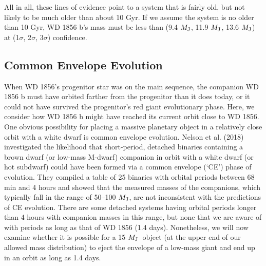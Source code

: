 \documentclass{nature3}
\newcommand*{\bedit}{\textcolor{new_black}}
\newcommand{\mjup}{\ensuremath{M_{\rm J}}}
\begin{document}
\begin{methods}
All in all, these lines of evidence point to a system that is fairly old, but not likely to be much older than about 10 Gyr. If we assume the system is no older than 10 Gyr, WD 1856 b's mass must be less than (9.4 \mjup, 11.9 \mjup, 13.6 \mjup) at (1$\sigma$, 2$\sigma$, 3$\sigma$) confidence.  


\subsection{Common Envelope Evolution}
When WD 1856's progenitor star was on the main sequence, the companion WD 1856 b must have orbited farther from the progenitor than it does today, or it could not have survived the progenitor's red giant evolutionary phase. Here, we consider how WD 1856 b might have reached its current orbit close to WD 1856. One obvious possibility for placing a massive planetary object in a relatively close orbit with a white dwarf is common envelope \bedit{evolution}\cite{Paczynski1976, Webbink84, Pfahl03}. Nelson et al. (2018)\cite{nelson2018} investigated the likelihood that short-period, detached binaries containing a brown dwarf (or low-mass M-dwarf) companion in orbit with a white dwarf (or hot subdwarf) could have been formed via a common envelope (`CE') phase of evolution. They compiled a table of 25 binaries with orbital periods between 68 min and 4 hours and showed that the measured masses of the companions, which typically fall in the range of 50–100 \mjup, are not inconsistent with the predictions of CE evolution. There are some detached systems having orbital periods longer than 4 hours with companion masses in this range, but none that we are aware of with periods as long as that of WD 1856 (1.4 days). Nonetheless, we will now examine whether it is possible for a 15 \mjup~object (at the upper end of our allowed mass distribution) to eject the envelope of a low-mass giant and end up in an orbit as long as 1.4 days.


\end{methods}
\end{document}
